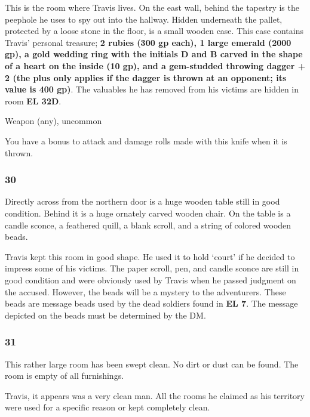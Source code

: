\documentclass[palace_of_the_silver_princess]{subfiles}
\begin{document}
This is the room where Travis lives. On the east wall, behind the
tapestry is the peephole he uses to spy out into the hallway. Hidden
underneath the pallet, protected by a loose stone in the floor, is a
small wooden case. This case contains Travis’ personal treasure;
\textbf{2 rubies (300 gp each), 1 large emerald (2000 gp), a gold
    wedding ring with the initials D and B carved in the shape of a
    heart on the inside (10 gp), and a gem-studded throwing dagger + 2
    (the plus only applies if the dagger is thrown at an opponent; its
value is 400 gp)}. The valuables he has removed from his victims are
hidden in room \textbf{EL 32D}.

{Weapon (any), uncommon}

You have a bonus to attack and damage rolls made with this knife when it
is thrown.

\subsubsection{30}
\begin{quotebox}
    Directly across from the northern door is a huge wooden table still
    in good condition. Behind it is a huge ornately carved wooden chair.
    On the table is a candle sconce, a feathered quill, a blank scroll,
    and a string of colored wooden beads.
\end{quotebox}

Travis kept this room in good shape. He used it to hold ‘court’ if he
decided to impress some of his victims. The paper scroll, pen, and
candle sconce are still in good condition and were obviously used by
Travis when he passed judgment on the accused. However, the beads will
be a mystery to the adventurers. These beads are message beads used by
the dead soldiers found in \textbf{EL 7}. The message depicted on the beads
must be determined by the DM.

\subsubsection{31}
\begin{quotebox}
    This rather large room has been swept clean. No dirt or dust can be
    found. The room is empty of all furnishings.
\end{quotebox}

Travis, it appears was a very clean man. All the rooms he claimed as his
territory were used for a specific reason or kept completely clean.
\end{document}
